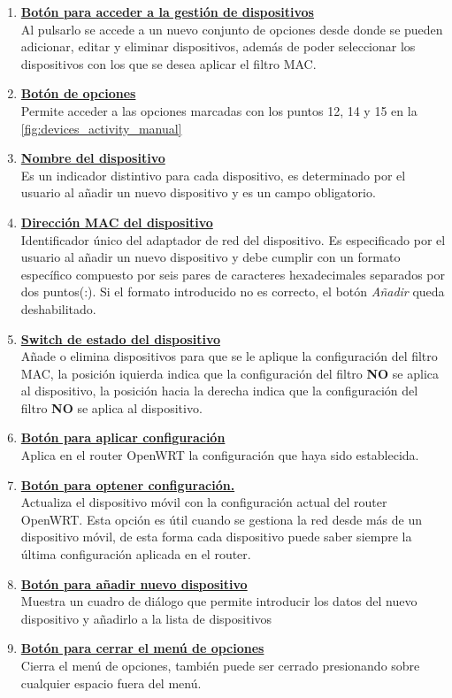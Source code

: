\documentclass[12pt]{article}
\begin{document}
\begin{enumerate}
            \item \textbf{\underline{Botón para acceder a la gestión de dispositivos}} \\
            Al pulsarlo se accede a un nuevo conjunto de opciones desde donde se pueden adicionar, editar y eliminar dispositivos, además de poder seleccionar los dispositivos con los que se desea aplicar el filtro MAC.
            \item \textbf{\underline{Botón de opciones}} \\
            Permite acceder a las opciones marcadas con los puntos 12, 14 y 15 en la \ref{fig:devices_activity_manual}
            \item \textbf{\underline{Nombre del dispositivo}} \\
            Es un indicador distintivo para cada dispositivo, es determinado por el usuario al añadir un nuevo dispositivo y es un campo obligatorio.
            \item \textbf{\underline{Dirección MAC del dispositivo}} \\
            Identificador único del adaptador de red del dispositivo. Es especificado por el usuario al añadir un nuevo dispositivo y debe cumplir con un formato específico compuesto por seis pares de caracteres hexadecimales separados por dos puntos(:). Si el formato introducido no es correcto, el botón \textit{Añadir} queda deshabilitado.
            \item \textbf{\underline{Switch de estado del dispositivo}} \\
            Añade o elimina dispositivos para que se le aplique la configuración del filtro MAC, la posición iquierda indica que la configuración del filtro \textbf{NO} se aplica al dispositivo, la posición hacia la derecha indica que la configuración del filtro \textbf{NO} se aplica al dispositivo.
            \item \textbf{\underline{Botón para aplicar configuración}} \\
            Aplica en el router OpenWRT la configuración que haya sido establecida.
            \item \textbf{\underline{Botón para optener configuración.}} \\
            Actualiza el dispositivo móvil con la configuración actual del router OpenWRT. Esta opción es útil cuando se gestiona la red desde más de un dispositivo móvil, de esta forma cada dispositivo puede saber siempre la última configuración aplicada en el router.
            \item \textbf{\underline{Botón para añadir nuevo dispositivo}} \\
            Muestra un cuadro de diálogo que permite introducir los datos del nuevo dispositivo y añadirlo a la lista de dispositivos
            \item \textbf{\underline{Botón para cerrar el menú de opciones}} \\
            Cierra el menú de opciones, también puede ser cerrado presionando sobre cualquier espacio fuera del menú.
            
        \end{enumerate}
\end{document}
